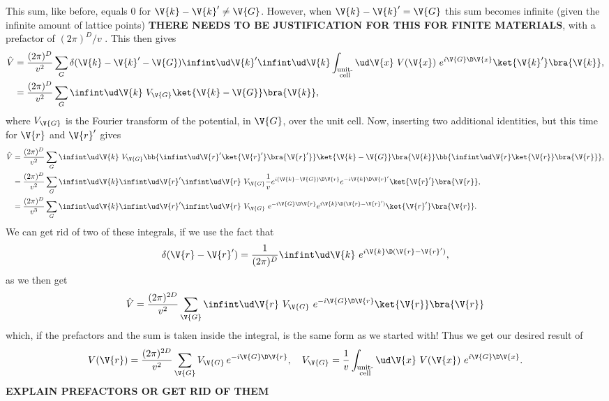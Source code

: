 \documentclass[main.tex]{subfiles}
\begin{document}
	This sum, like before, equals 0 for $ \V{k}-\V{k}' \neq \V{G} $. However, when $ \V{k}-\V{k}' = \V{G} $ this sum becomes infinite (given the infinite amount of lattice points) \textbf{THERE NEEDS TO BE JUSTIFICATION FOR THIS FOR FINITE MATERIALS}, with a prefactor of $ (2\pi)^D/v $ \cite{simon}. This then gives
	\begin{align}
		\hat{V} &= \frac{(2\pi)^D}{v^2} \sum_{G} \delta(\V{k}-\V{k}'-\V{G}) \infint \ud \V{k}' \infint \ud \V{k} \int_{\substack{\text{unit-} \\\text{cell}}} \ud \V{x}\ V(\V{x})\  e^{i \V{G} \D \V{x}} \ket{\V{k}'} \bra{\V{k}}, \\
		&= \frac{(2\pi)^D}{v^2} \sum_{G} \infint \ud \V{k}\ V_{\V{G}} \ket{\V{k}-\V{G}} \bra{\V{k}},
	\end{align}
	where $ V_{\V{G}} $ is the Fourier transform of the potential, in $ \V{G} $, over the unit cell. Now, inserting two additional identities, but this time for $ \V{r} $ and $ \V{r}' $ gives
	\begin{align}
		\hat{V} &= \frac{(2\pi)^D}{v^2} \sum_{G} \infint \ud \V{k} \ V_{\V{G}} \bb{\infint \ud \V{r}' \ket{\V{r}'} \bra{\V{r}'}} \ket{\V{k}-\V{G}} \bra{\V{k}} \bb{\infint \ud \V{r} \ket{\V{r}} \bra{\V{r}} }, \\
		&= \frac{(2\pi)^D}{v^2} \sum_{G} \infint \ud \V{k} \infint \ud \V{r}' \infint \ud \V{r} \   V_{\V{G}} \frac{1}{v} e^{i (\V{k}-\V{G}) \D \V{r}} e^{-i \V{k} \D \V{r}'} \ket{\V{r}'} \bra{\V{r}}, \\
		&= \frac{(2\pi)^D}{v^3} \sum_{G} \infint \ud \V{k} \infint \ud \V{r}' \infint \ud \V{r} \  V_{\V{G}} \  e^{-i \V{G} \D \V{r}} e^{i \V{k} \D (\V{r}-\V{r}')} \ket{\V{r}'} \bra{\V{r}}.
	\end{align}
	We can get rid of two of these integrals, if we use the fact that \cite{riley}
	\begin{equation}
		\delta(\V{r}-\V{r}') = \frac{1}{(2\pi)^D} \infint \ud \V{k}\  e^{i \V{k} \D (\V{r}-\V{r}')},
	\end{equation}
	as we then get
	\begin{equation}
		\hat{V} = \frac{(2\pi)^{2D}}{v^2} \sum_{\V{G}} \infint \ud \V{r} \ V_{\V{G}}\ e^{-i \V{G} \D \V{r}} \ket{\V{r}} \bra{\V{r}}
	\end{equation}
	which, if the prefactors and the sum is taken inside the integral, is the same form as we started with! Thus we get our desired result of
	\begin{equation}
		V(\V{r}) =  \frac{(2\pi)^{2D}}{v^2} \sum_{\V{G}} V_{\V{G}} \,e^{-i \V{G} \D \V{r}}, \quad V_{\V{G}} = \frac{1}{v} \int_{\substack{\text{unit-} \\\text{cell}}} \ud \V{x}\ V(\V{x})\  e^{i \V{G} \D \V{x}}.
	\end{equation}
	\textbf{EXPLAIN PREFACTORS OR GET RID OF THEM}
	
\end{document}
